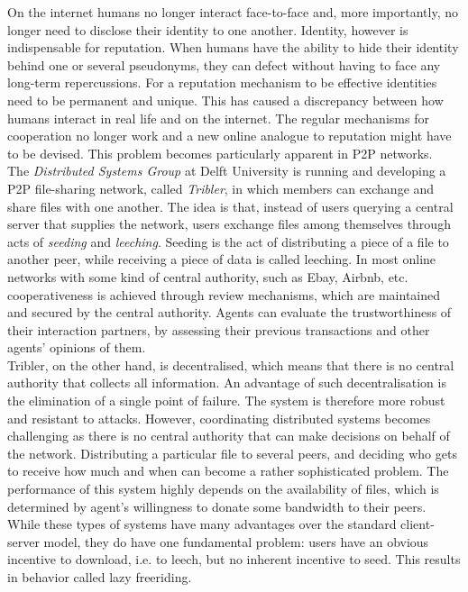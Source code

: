 \documentclass[11pt,a4paper]{article}
\theoremstyle{definition}
\theoremstyle{theorem}
\begin{document}
\noindent{}On the internet humans no longer interact face-to-face and, more importantly, no longer need to disclose their identity to one another. Identity, however is indispensable for reputation. When humans have the ability to hide their identity behind one or several pseudonyms, they can defect without having to face any long-term repercussions. For a reputation mechanism to be effective identities need to be permanent and unique. This has caused a discrepancy between how humans interact in real life and on the internet. The regular mechanisms for cooperation no longer work and a new online analogue to reputation might have to be devised. This problem becomes particularly apparent in P2P networks.\vspace{1em}\\

\noindent{}The {\it Distributed Systems Group} at Delft University is running and developing a P2P file-sharing network, called {\it Tribler}, in which members can exchange and share files with one another. The idea is that, instead of users querying a central server that supplies the network, users exchange files among themselves through acts of {\it seeding} and {\it leeching}. Seeding is the act of distributing a piece of a file to another peer, while receiving a piece of data is called leeching. In most online networks with some kind of central authority, such as Ebay, Airbnb, etc. cooperativeness is achieved through review mechanisms, which are maintained and secured by the central authority. Agents can evaluate the trustworthiness of their interaction partners, by assessing their previous transactions and other agents' opinions of them.\vspace{1em}\\ 

\noindent{}Tribler, on the other hand, is decentralised, which means that there is no central authority that collects all information. An advantage of such decentralisation is the elimination of a single point of failure. The system is therefore more robust and resistant to attacks. However, coordinating distributed systems becomes challenging as there is no central authority that can make decisions on behalf of the network. Distributing a particular file to several peers, and deciding who gets to receive how much and when can become a rather sophisticated problem. The performance of this system highly depends on the availability of files, which is determined by agent's willingness to donate some bandwidth to their peers. While these types of systems have many advantages over the standard client-server model, they do have one fundamental problem: users have an obvious incentive to download, i.e. to leech, but no inherent incentive to seed. This results in behavior called lazy freeriding. \vspace{1em}\\
\end{document}
